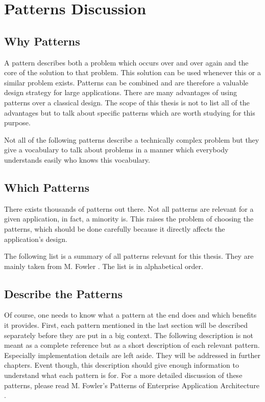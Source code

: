 \chapter{Patterns Discussion}

	\section{Why Patterns}
		A pattern describes both a problem which occurs over and over again and
		the core of the solution to that problem. This solution can be used
		whenever this or a similar problem exists. Patterns can be combined and are 
		therefore a valuable design strategy for large applications. There are many advantages
		of using patterns over a classical design. The scope of this thesis is not to 
		list all of the advantages but to talk about specific patterns which are worth studying
		for this purpose.
		
		Not all of the following patterns describe a technically complex problem but they
		give a vocabulary to talk about problems in a manner which everybody understands
		easily who knows this vocabulary.
		
	\section{Which Patterns}
		There exists thousands of patterns out there. Not all patterns are relevant
		for a given application, in fact, a minority is. This raises the problem
		of choosing the patterns, which should be done carefully because it directly
		affects the application's design.

		The following list is a summary of all patterns relevant for this thesis. They are 
		mainly taken from M. Fowler \cite{Fowler03}. The list is in alphabetical order.

	\section{Describe the Patterns}
		Of course, one needs to know what a pattern at the end does and which
		benefits it provides. First, each pattern mentioned in the last section will 
		be described separately before they are put in a big context. The following 
		description is not meant as a complete reference but as a short description
		of each relevant pattern. Especially implementation details are left aside. They will be
		addressed in further chapters. Event though, this description should give enough information to understand
		what each pattern is for. For a more detailed discussion of these patterns, please read
		M. Fowler's Patterns of Enterprise Application Architecture \cite{Fowler03}.
		
